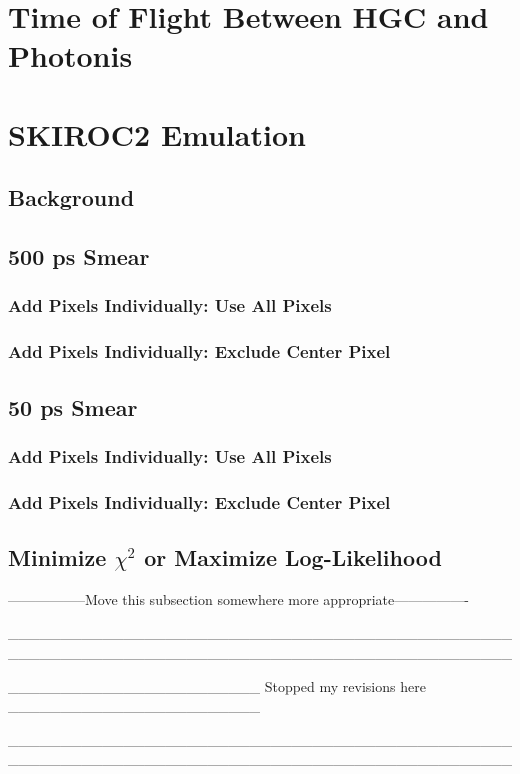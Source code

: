 \documentclass[12pt]{article}
\begin{document}
\section{Time of Flight Between HGC and Photonis}
\section{SKIROC2 Emulation}
\subsection{Background}
\subsection{500 ps Smear}
\subsubsection{Add Pixels Individually: Use All Pixels}
\subsubsection{Add Pixels Individually: Exclude Center Pixel}
\subsection{50 ps Smear}
\subsubsection{Add Pixels Individually: Use All Pixels}
\subsubsection{Add Pixels Individually: Exclude Center Pixel}
\subsection{Minimize $\chi^2$ or Maximize Log-Likelihood}
-----------------Move this subsection somewhere more appropriate----------------

\_\_\_\_\_\_\_\_\_\_\_\_\_\_\_\_\_\_\_\_\_\_\_\_\_\_\_\_\_\_\_\_\_\_\_\_\_\_\_\_\_\_\_\_\_\_\_\_\_\_\_\_\_\_\_\_\_\_\_\_\_\_\_\_\_\_\_\_\_\_\_\_\_\_\_\_\_\_\_\_\_\_\_\_\_\_\_\_\_\_\_\_\_\_\_\_

\_\_\_\_\_\_\_\_\_\_\_\_\_\_\_\_\_\_\_\_\_\_\_\_ Stopped my revisions here \_\_\_\_\_\_\_\_\_\_\_\_\_\_\_\_\_\_\_\_\_\_\_\_

\_\_\_\_\_\_\_\_\_\_\_\_\_\_\_\_\_\_\_\_\_\_\_\_\_\_\_\_\_\_\_\_\_\_\_\_\_\_\_\_\_\_\_\_\_\_\_\_\_\_\_\_\_\_\_\_\_\_\_\_\_\_\_\_\_\_\_\_\_\_\_\_\_\_\_\_\_\_\_\_\_\_\_\_\_\_\_\_\_\_\_\_\_\_\_\_
\end{document}
